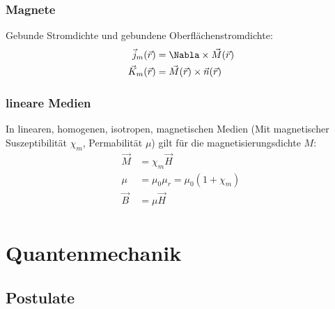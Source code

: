 \documentclass[11pt]{article}
\numberwithin{equation}{section}
\begin{document}
      \subsubsection{Magnete}
        Gebunde Stromdichte und gebundene Oberflächenstromdichte:
        \begin{equation}
          \begin{aligned}
            \vec{j}_m(\vec{r}) &= \Nabla\times\vec{M}(\vec{r}) \\
            \vec{K}_m(\vec{r}) &= \vec{M}(\vec{r})\times \vec{n}(\vec{r}) \\
          \end{aligned}
        \end{equation}

      \subsubsection{lineare Medien}
        In linearen, homogenen, isotropen, magnetischen Medien (Mit magnetischer Suszeptibilität $\chi_m$, Permabilität $\mu$) gilt für die magnetisierungsdichte $M$:
        \begin{equation}
          \begin{aligned}
            \vec{M} &= \chi_m\vec{H} \\
            \mu &= \mu_0 \mu_r = \mu_0(1+\chi_m) \\
            \vec{B} &= \mu \vec{H} \\
          \end{aligned}
        \end{equation}



  \newpage
	\section{Quantenmechanik}
    \subsection{Postulate}
\end{document}
